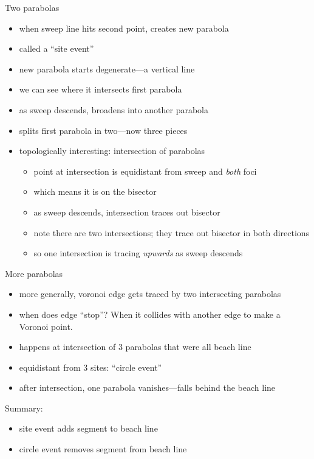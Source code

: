 \documentclass{article}
\begin{document}
Two parabolas
\begin{itemize}
\item when sweep line hits second point, creates new parabola
\item called a ``site event''
\item new parabola starts degenerate---a vertical line
\item we can see where it intersects first parabola
\item as sweep descends, broadens into another parabola
\item splits first parabola in two---now three pieces
\item topologically interesting: intersection of parabolas
\begin{itemize}
\item point at intersection is equidistant from sweep and \emph{both}
  foci
\item which means it is on the bisector
\item as sweep descends, intersection traces out bisector
\item note there are two intersections; they trace out bisector in
  both directions
\item so one intersection is tracing \emph{upwards} as sweep descends
\end{itemize}
\end{itemize}

More parabolas
\begin{itemize}
\item more generally, voronoi edge gets traced by two intersecting parabolas
\item when does edge ``stop''?  When it collides with another edge to
  make a Voronoi point.
\item happens at intersection of 3 parabolas that were all beach line
\item equidistant from 3 sites: ``circle event''
\item after intersection, one parabola vanishes---falls behind the
  beach line
\end{itemize}

Summary:
\begin{itemize}
\item site event adds segment to beach line
\item circle event removes segment from beach line
\end{itemize}
\end{document}
